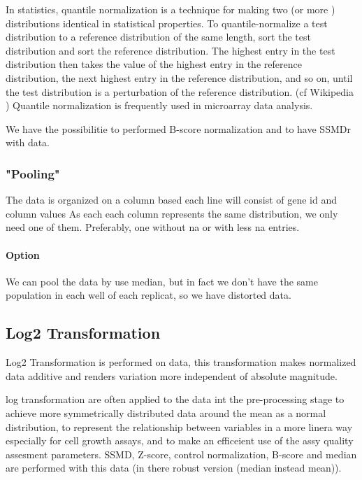 \documentclass[a4paper,10pt]{article}
\begin{document}
In statistics, quantile normalization is a technique for making two (or more ) distributions identical in statistical properties. 
To quantile-normalize a test distribution to a reference distribution of the same length, sort the test distribution and sort the 
reference distribution. The highest entry in the test distribution then takes the value of the highest entry in the reference 
distribution, the next highest entry in the reference distribution, and so on, until the test distribution is a perturbation of the 
reference distribution. (cf Wikipedia ) Quantile normalization is frequently used in microarray data analysis.


We have the possibilitie to performed B-score normalization and to have SSMDr with data.

\subsubsection*{"Pooling"}


The data is organized on a column based each line will consist of gene id and column values As each each column
represents the same distribution, we only need one of them. Preferably, one without na or with less na entries.

\paragraph{Option}

We can pool the data by use median, but in fact we don't have the same population in each well of each replicat, so
we have distorted data.


\subsection*{Log2 Transformation}


Log2 Transformation is performed on data, this transformation makes normalized data additive and renders variation more independent of absolute magnitude.

log transformation are often applied to the data int the pre-processing stage to achieve more symmetrically distributed data around the mean 
as a normal distribution, to represent the relationship between variables in a more linera way especially for cell growth assays, and to make
an efficeient use of the assy quality assesment parameters.
SSMD, Z-score, control normalization, B-score and median are performed with this data (in there robust version (median instead mean)).
\end{document}
